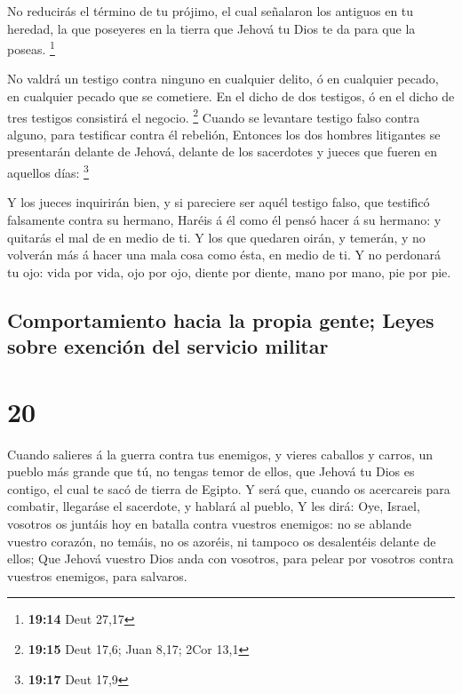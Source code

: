  No reducirás el término de tu prójimo, el cual señalaron
los antiguos en tu heredad, la que poseyeres en la tierra que Jehová tu
Dios te da para que la poseas. \footnote{\textbf{19:14} Deut 27,17}

 No valdrá un testigo contra ninguno en cualquier delito, ó
en cualquier pecado, en cualquier pecado que se cometiere. En el dicho
de dos testigos, ó en el dicho de tres testigos consistirá el negocio.
\footnote{\textbf{19:15} Deut 17,6; Juan 8,17; 2Cor 13,1} 
Cuando se levantare testigo falso contra alguno, para testificar contra
él rebelión,  Entonces los dos hombres litigantes se
presentarán delante de Jehová, delante de los sacerdotes y jueces que
fueren en aquellos días: \footnote{\textbf{19:17} Deut 17,9}

 Y los jueces inquirirán bien, y si pareciere ser aquél
testigo falso, que testificó falsamente contra su hermano, 
Haréis á él como él pensó hacer á su hermano: y quitarás el mal de en
medio de ti.  Y los que quedaren oirán, y temerán, y no
volverán más á hacer una mala cosa como ésta, en medio de ti.
 Y no perdonará tu ojo: vida por vida, ojo por ojo, diente
por diente, mano por mano, pie por pie.

\hypertarget{comportamiento-hacia-la-propia-gente-leyes-sobre-exenciuxf3n-del-servicio-militar}{%
\subsection{Comportamiento hacia la propia gente; Leyes sobre exención
del servicio
militar}\label{comportamiento-hacia-la-propia-gente-leyes-sobre-exenciuxf3n-del-servicio-militar}}

\hypertarget{section-19}{%
\section{20}\label{section-19}}

 Cuando salieres á la guerra contra tus enemigos, y vieres
caballos y carros, un pueblo más grande que tú, no tengas temor de
ellos, que Jehová tu Dios es contigo, el cual te sacó de tierra de
Egipto.  Y será que, cuando os acercareis para combatir,
llegaráse el sacerdote, y hablará al pueblo,  Y les dirá:
Oye, Israel, vosotros os juntáis hoy en batalla contra vuestros
enemigos: no se ablande vuestro corazón, no temáis, no os azoréis, ni
tampoco os desalentéis delante de ellos;  Que Jehová vuestro
Dios anda con vosotros, para pelear por vosotros contra vuestros
enemigos, para salvaros.

